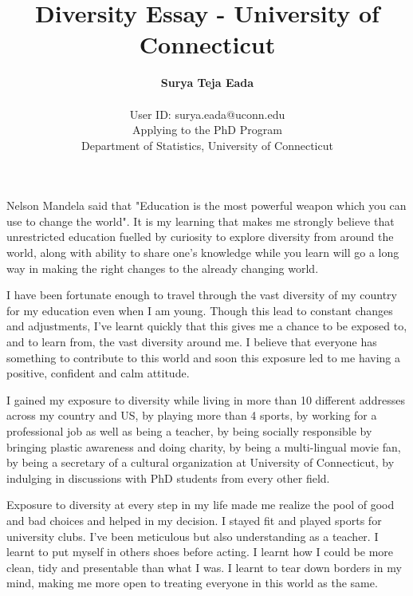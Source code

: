 

\title{Diversity Essay - University of Connecticut}
\date{}
\author{{\bf Surya Teja Eada} \\  \ \ \\ {\small User ID: surya.eada@uconn.edu }\\ {\small Applying to the PhD Program } \\ {\small Department of Statistics, University of Connecticut} }
\maketitle



 Nelson Mandela said that "Education is the most powerful weapon which you can use to change the world". It is my learning that makes me strongly believe that unrestricted education fuelled by curiosity to explore diversity from around the world, along with ability to share one's knowledge while you learn will go a long way in making the right changes to the already changing world. 
 
 I have been fortunate enough to travel through the vast diversity of my country for my education even when I am young. Though this lead to constant changes and adjustments, I've learnt quickly that this gives me a chance to be exposed to, and to learn from, the vast diversity around me. I believe that everyone has something to contribute to this world and soon this exposure led to me having a positive, confident and calm attitude. 
 
 I gained my exposure to diversity while living in more than 10 different addresses across my country and US, by playing more than 4 sports, by working for a professional job as well as being a teacher, by being socially responsible by bringing plastic awareness and doing charity, by being a multi-lingual movie fan, by being a secretary of a cultural organization at University of Connecticut, by indulging in discussions with PhD students from every other field.
 
 Exposure to diversity at every step in my life made me realize the pool of good and bad choices and helped in my decision. I stayed fit and played sports for university clubs. I've been meticulous but also understanding as a teacher. I learnt to put myself in others shoes before acting. I learnt how I could be more clean, tidy and presentable than what I was. I learnt to tear down borders in my mind, making me more open to treating everyone in this world as the same.
 

